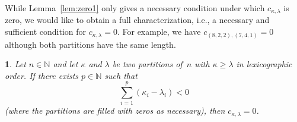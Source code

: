 \documentclass[10pt,oneside,american]{amsart}
\numberwithin{equation}{section}
\numberwithin{figure}{section}
\theoremstyle{plain}
\theoremstyle{definition}
\theoremstyle{remark}
\theoremstyle{plain}
\newtheorem{prop}[thm]{\protect\propositionname}
\theoremstyle{definition}
\theoremstyle{plain}
\theoremstyle{plain}
\providecommand{\propositionname}{Proposition}
\begin{document}
While Lemma~\ref{lem:zero1} only gives a necessary condition under which
$c_{\kappa,\lambda}$ is zero, we would like to obtain a full characterization,
i.e., a necessary and sufficient condition for $c_{\kappa,\lambda}=0$. For
example, we have $c_{(8,2,2),(7,4,1)} = 0$ although both partitions have the
same length.
\begin{prop}\label{prop:zero2}
  Let $n\in\mathbb{N}$ and let $\kappa$ and $\lambda$ be two partitions of~$n$
  with $\kappa\geq\lambda$ in lexicographic order. If there exists
  $p\in\mathbb{N}$ such that
  \begin{equation}\label{eq:prop}
    \sum_{i=1}^p (\kappa_i - \lambda_i) < 0
  \end{equation}
  (where the partitions are filled with zeros as necessary), then
  $c_{\kappa,\lambda}=0$.
\end{prop}
\end{document}
